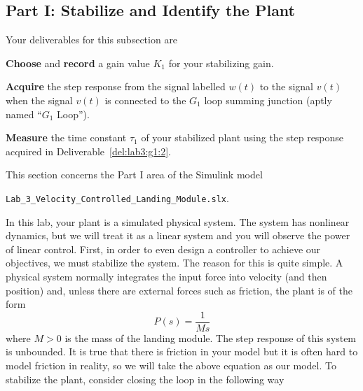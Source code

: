 \subsection{Part I: Stabilize and Identify the Plant}\label{Lab:3:Part:I}
Your deliverables for this subsection are
%
\begin{deliverable}[label={del:lab3:g1:1}]
  \textbf{Choose} and \textbf{record} a gain value \(K_1\) for your stabilizing gain.
\end{deliverable}
%
\begin{deliverable}[label={del:lab3:g1:2}]
   \textbf{Acquire} the step response from the signal labelled \(w(t)\) to the signal \(v(t)\) when the signal \(v(t)\) is connected to the \(G_1\) loop summing junction (aptly named ``\(G_1\) Loop'').
\end{deliverable}
%
\begin{deliverable}[label={del:lab3:g1:3}]
  \textbf{Measure} the time constant \(\tau_1\) of your stabilized plant using the step response acquired in Deliverable~\ref{del:lab3:g1:2}.
\end{deliverable}
%
This section concerns the Part I area of the Simulink model
\begin{center}
  \texttt{Lab\_3\_Velocity\_Controlled\_Landing\_Module.slx}.
\end{center}
In this lab, your plant is a simulated physical system.
The system has nonlinear dynamics, but we will treat it as a linear system and you will observe the power of linear control.
First, in order to even design a controller to achieve our objectives, we must stabilize the system.
The reason for this is quite simple. A physical system normally integrates the input force into velocity (and then position) and, unless there are external forces such as friction, the plant is of the form
\[
  P(s)
    =
      \frac{1}{M s}
\]
where \(M > 0\) is the mass of the landing module.
The step response of this system is unbounded.
It is true that there is friction in your model but it is often hard to model friction in reality, so we will take the above equation as our model.
To stabilize the plant, consider closing the loop in the following way
%
